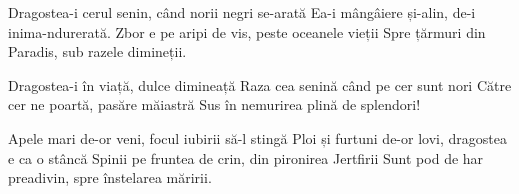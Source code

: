 
\beginverse
Dragostea-i cerul senin, când norii negri se-arată
Ea-i mângâiere și-alin, de-i inima-ndurerată.
Zbor e pe aripi de vis, peste oceanele vieții
Spre țărmuri din Paradis, sub razele dimineții.
\endverse

\beginchorus
Dragostea-i în viață, dulce dimineață
Raza cea senină când pe cer sunt nori
Către cer ne poartă, pasăre măiastră
Sus în nemurirea plină de splendori!
\endchorus

\beginverse
Apele mari de-or veni, focul iubirii să-l stingă
Ploi și furtuni de-or lovi, dragostea e ca o stâncă
Spinii pe fruntea de crin, din pironirea Jertfirii
Sunt pod de har preadivin, spre înstelarea măririi. 
\endverse

\endsong

